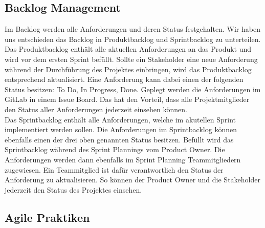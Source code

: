 \documentclass{article}
\begin{document}
\subsection{Backlog Management}
Im Backlog werden alle Anforderungen und deren Status festgehalten.
Wir haben uns entschieden das Backlog in Produktbacklog und Sprintbacklog zu unterteilen.\\
Das Produktbacklog enthält alle aktuellen Anforderungen an das Produkt und wird vor dem ersten Sprint befüllt.
Sollte ein Stakeholder eine neue Anforderung während der Durchführung des Projektes einbringen, wird das Produktbacklog entsprechend aktualisiert.
Eine Anforderung kann dabei einen der folgenden Status besitzen: To Do, In Progress, Done.
Geplegt werden die Anforderungen im GitLab in einem Issue Board.
Das hat den Vorteil, dass alle Projektmitglieder den Status aller Anforderungen jederzeit einsehen können.\\
Das Sprintbacklog enthält alle Anforderungen, welche im akutellen Sprint implementiert werden sollen.
Die Anforderungen im Sprintbacklog können ebenfalls einen der drei oben genannten Status besitzen.
Befüllt wird das Sprintbacklog während des Sprint Plannings vom Product Owner.
Die Anforderungen werden dann ebenfalls im Sprint Planning Teammitgliedern zugewiesen.
Ein Teammitglied ist dafür verantwortlich den Status der Anforderung zu aktualisieren.
So können der Product Owner und die Stakeholder jederzeit den Status des Projektes einsehen.

\subsection{Agile Praktiken}
\end{document}
